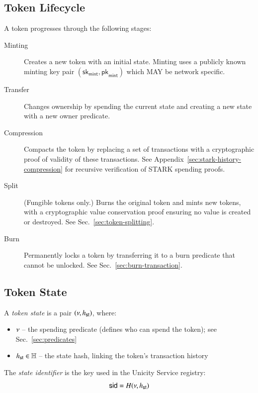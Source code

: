 \subsection{Token Lifecycle}\label{sec:token-lifecycle}

A token progresses through the following stages:
\begin{description}
\item[Minting] Creates a new token with an initial state. Minting uses a publicly known minting key pair $(\mathsf{sk}_\mathsf{mint}, \mathsf{pk}_\mathsf{mint})$ which MAY be network specific.
\item[Transfer] Changes ownership by spending the current state and creating a new state with a new owner predicate.
\item[Compression] Compacts the token by replacing a set of transactions with a cryptographic proof of validity of these transactions. See Appendix~\ref{sec:stark-history-compression} for recursive verification of STARK spending proofs.
\item[Split] (Fungible tokens only.) Burns the original token and mints new tokens, with a cryptographic value conservation proof ensuring no value is created or destroyed. See Sec.~\ref{sec:token-splitting}.
\item[Burn] Permanently locks a token by transferring it to a burn predicate that cannot be unlocked. See Sec.~\ref{sec:burn-transaction}.
\end{description}

\subsection{Token State}\label{sec:token-state}

A \emph{token state} is a pair $(\nu, {h_\mathsf{st}})$, where:
\begin{itemize}
	\item $\nu$ -- the spending predicate (defines who can spend the token); see Sec.~\ref{sec:predicates}
	\item ${h_\mathsf{st}} \in \mathbb{H}$ -- the state hash, linking the token's transaction history
\end{itemize}

The \emph{state identifier} is the key used in the Unicity Service registry:
\[
\mathsf{sid} = H(\nu, {h_\mathsf{st}})
\]

